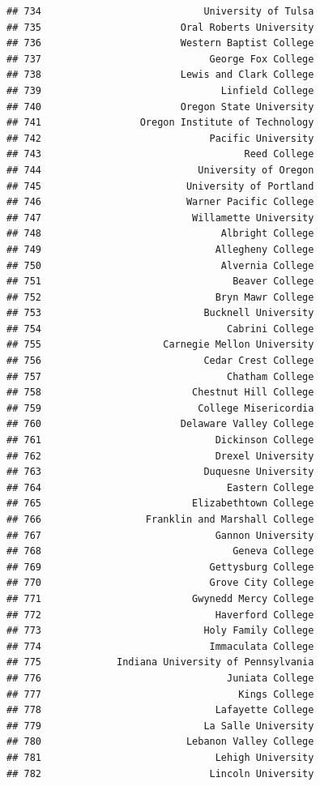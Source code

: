 \documentclass[]{article}
\begin{document}
\begin{verbatim}
## 734                            University of Tulsa
## 735                        Oral Roberts University
## 736                        Western Baptist College
## 737                             George Fox College
## 738                        Lewis and Clark College
## 739                               Linfield College
## 740                        Oregon State University
## 741                 Oregon Institute of Technology
## 742                             Pacific University
## 743                                   Reed College
## 744                           University of Oregon
## 745                         University of Portland
## 746                         Warner Pacific College
## 747                          Willamette University
## 748                               Albright College
## 749                              Allegheny College
## 750                               Alvernia College
## 751                                 Beaver College
## 752                              Bryn Mawr College
## 753                            Bucknell University
## 754                                Cabrini College
## 755                     Carnegie Mellon University
## 756                            Cedar Crest College
## 757                                Chatham College
## 758                          Chestnut Hill College
## 759                           College Misericordia
## 760                        Delaware Valley College
## 761                              Dickinson College
## 762                              Drexel University
## 763                            Duquesne University
## 764                                Eastern College
## 765                          Elizabethtown College
## 766                  Franklin and Marshall College
## 767                              Gannon University
## 768                                 Geneva College
## 769                             Gettysburg College
## 770                             Grove City College
## 771                          Gwynedd Mercy College
## 772                              Haverford College
## 773                            Holy Family College
## 774                             Immaculata College
## 775             Indiana University of Pennsylvania
## 776                                Juniata College
## 777                                  Kings College
## 778                              Lafayette College
## 779                            La Salle University
## 780                         Lebanon Valley College
## 781                              Lehigh University
## 782                             Lincoln University

\end{verbatim}
\end{document}

